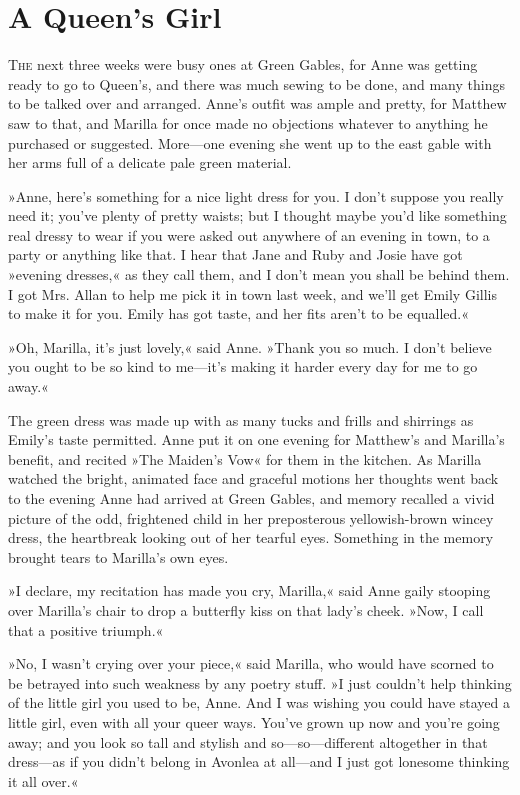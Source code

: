 \chapter{A Queen's Girl}

\lettrine[lines=4]{T}{he} next three weeks were busy ones at Green Gables, for Anne was getting ready to go to Queen's, and there was much sewing to be done, and many things to be talked over and arranged. Anne's outfit was ample and pretty, for Matthew saw to that, and Marilla for once made no objections whatever to anything he purchased or suggested. More—one evening she went up to the east gable with her arms full of a delicate pale green material.

»Anne, here's something for a nice light dress for you. I don't suppose you really need it; you've plenty of pretty waists; but I thought maybe you'd like something real dressy to wear if you were asked out anywhere of an evening in town, to a party or anything like that. I hear that Jane and Ruby and Josie have got »evening dresses,« as they call them, and I don't mean you shall be behind them. I got Mrs. Allan to help me pick it in town last week, and we'll get Emily Gillis to make it for you. Emily has got taste, and her fits aren't to be equalled.«

»Oh, Marilla, it's just lovely,« said Anne. »Thank you so much. I don't believe you ought to be so kind to me—it's making it harder every day for me to go away.«

The green dress was made up with as many tucks and frills and shirrings as Emily's taste permitted. Anne put it on one evening for Matthew's and Marilla's benefit, and recited »The Maiden's Vow« for them in the kitchen. As Marilla watched the bright, animated face and graceful motions her thoughts went back to the evening Anne had arrived at Green Gables, and memory recalled a vivid picture of the odd, frightened child in her preposterous yellowish-brown wincey dress, the heartbreak looking out of her tearful eyes. Something in the memory brought tears to Marilla's own eyes.

»I declare, my recitation has made you cry, Marilla,« said Anne gaily stooping over Marilla's chair to drop a butterfly kiss on that lady's cheek. »Now, I call that a positive triumph.«

»No, I wasn't crying over your piece,« said Marilla, who would have scorned to be betrayed into such weakness by any poetry stuff. »I just couldn't help thinking of the little girl you used to be, Anne. And I was wishing you could have stayed a little girl, even with all your queer ways. You've grown up now and you're going away; and you look so tall and stylish and so—so—different altogether in that dress—as if you didn't belong in Avonlea at all—and I just got lonesome thinking it all over.«

